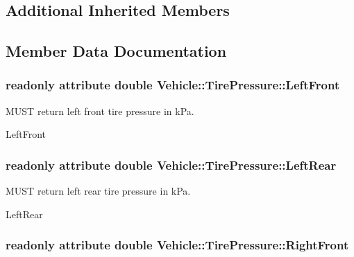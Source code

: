 \subsection*{Additional Inherited Members}


\subsection{Member Data Documentation}
\hypertarget{interfaceVehicle_1_1TirePressure_a6a8d57e9f5df937eff8f123d86f173e9}{
\subsubsection[{Left\-Front}]{\setlength{\rightskip}{0pt plus 5cm}readonly attribute double Vehicle\-::\-Tire\-Pressure\-::\-Left\-Front}}\label{interfaceVehicle_1_1TirePressure_a6a8d57e9f5df937eff8f123d86f173e9}


M\-U\-S\-T return left front tire pressure in k\-Pa. 

Left\-Front \hypertarget{interfaceVehicle_1_1TirePressure_a8ef065b13e159d1c2059dc2623e8b754}{
\subsubsection[{Left\-Rear}]{\setlength{\rightskip}{0pt plus 5cm}readonly attribute double Vehicle\-::\-Tire\-Pressure\-::\-Left\-Rear}}\label{interfaceVehicle_1_1TirePressure_a8ef065b13e159d1c2059dc2623e8b754}


M\-U\-S\-T return left rear tire pressure in k\-Pa. 

Left\-Rear \hypertarget{interfaceVehicle_1_1TirePressure_a483e1b18f534cde6240a33e5ae593df2}{
\subsubsection[{Right\-Front}]{\setlength{\rightskip}{0pt plus 5cm}readonly attribute double Vehicle\-::\-Tire\-Pressure\-::\-Right\-Front}}\label{interfaceVehicle_1_1TirePressure_a483e1b18f534cde6240a33e5ae593df2}


